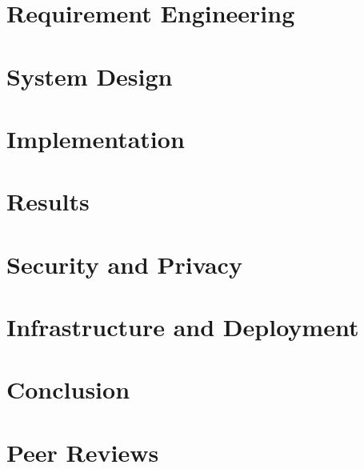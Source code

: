 \documentclass[a4paper, 11pt, oneside]{report}
\begin{document}
        \chapter{Requirement Engineering}
        
        \chapter{System Design}
        
        \chapter{Implementation}
        
        \chapter{Results}
        
        \chapter{Security and Privacy}
        
        \chapter{Infrastructure and Deployment}
        
        \chapter{Conclusion}
        

        \chapter*{Peer Reviews}
\end{document}

